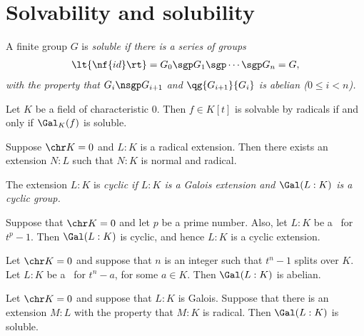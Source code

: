 \documentclass[a4paper]{article}
\begin{document}
\section{Solvability and solubility}
\begin{tdefinition}
  A finite group \( G \) is \it{soluble} if there is a series of groups \begin{align*}
    \lt\{ \nf{id} \rt\} = G_0 \sgp G_1 \sgp \cdots\sgp G_n = G,
  \end{align*}
  with the property that \( G_i \nsgp G_{i+1} \) and \( \qg{G_{i+1}}{G_i} \) is abelian (\( 0\leq i < n \)).
\end{tdefinition}

\begin{ttheorem}
  Let \( K \) be a field of characteristic 0.
  Then \( f\in K[t] \) is solvable by radicals if and only if \( \Gal_K(f) \) is soluble.
\end{ttheorem}

\begin{tlemma}
  Suppose \( \chr K = 0 \) and \( L:K \) is a radical extension.
  Then there exists an extension \( N:L \) such that \( N:K \) is normal and radical.
\end{tlemma}

\begin{tdefinition}
  The extension \( L:K \) is \it{cyclic} if \( L:K \) is a Galois extension and \( \Gal(L:K) \) is a cyclic group.
\end{tdefinition}

\begin{tlemma}
  Suppose that \( \chr K = 0 \) and let \( p \) be a prime number.
  Also, let \( L:K \) be a \sfe~for \( t^p-1 \).
  Then \( \Gal(L:K) \) is cyclic, and hence \( L:K \) is a cyclic extension.
\end{tlemma}

\begin{tlemma}
  Let \( \chr K = 0 \) and suppose that \( n \) is an integer such that \( t^n-1 \) splits over \( K \).
  Let \( L:K \) be a \sfe~for \( t^n-a \), for some \( a\in K \).
  Then \( \Gal(L:K) \) is abelian.
\end{tlemma}

\begin{ttheorem}
  Let \( \chr K = 0 \) and suppose that \( L:K \) is Galois.
  Suppose that there is an extension \( M:L \) with the property that \( M:K \) is radical.
  Then \( \Gal(L:K) \) is soluble.
\end{ttheorem}
\end{document}
